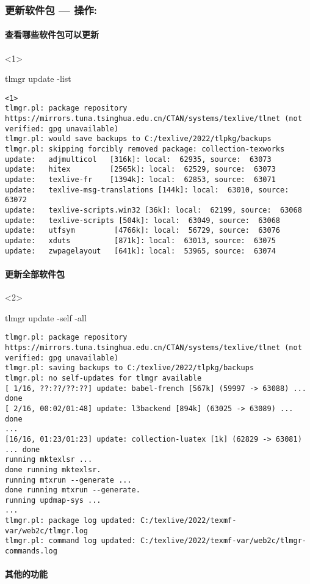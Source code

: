 \begin{frame}[fragile,t]
  \frametitle{更新软件包 --- 操作: }
  \framesubtitle<1>{查看哪些软件包可以更新}
  \begin{onlyenv}<1>
\begin{cmdcode}
tlmgr update -list
\end{cmdcode}
\begin{lstlisting}[basicstyle=\tiny\ttfamily,frame=single]<1>
tlmgr.pl: package repository https://mirrors.tuna.tsinghua.edu.cn/CTAN/systems/texlive/tlnet (not verified: gpg unavailable)
tlmgr.pl: would save backups to C:/texlive/2022/tlpkg/backups
tlmgr.pl: skipping forcibly removed package: collection-texworks
update:   adjmulticol   [316k]: local:  62935, source:  63073
update:   hitex         [2565k]: local:  62529, source:  63073
update:   texlive-fr    [1394k]: local:  62853, source:  63071
update:   texlive-msg-translations [144k]: local:  63010, source:  63072
update:   texlive-scripts.win32 [36k]: local:  62199, source:  63068
update:   texlive-scripts [504k]: local:  63049, source:  63068
update:   utfsym         [4766k]: local:  56729, source:  63076
update:   xduts          [871k]: local:  63013, source:  63075
update:   zwpagelayout   [641k]: local:  53965, source:  63074  
\end{lstlisting}
  \end{onlyenv}
  \framesubtitle<2>{更新全部软件包}
  \begin{onlyenv}<2>
\begin{cmdcode}
tlmgr update -self -all
\end{cmdcode}
\begin{lstlisting}[basicstyle=\tiny\ttfamily,frame=single]
tlmgr.pl: package repository https://mirrors.tuna.tsinghua.edu.cn/CTAN/systems/texlive/tlnet (not verified: gpg unavailable)
tlmgr.pl: saving backups to C:/texlive/2022/tlpkg/backups
tlmgr.pl: no self-updates for tlmgr available
[ 1/16, ??:??/??:??] update: babel-french [567k] (59997 -> 63088) ... done
[ 2/16, 00:02/01:48] update: l3backend [894k] (63025 -> 63089) ... done
...
[16/16, 01:23/01:23] update: collection-luatex [1k] (62829 -> 63081) ... done
running mktexlsr ...
done running mktexlsr.
running mtxrun --generate ...
done running mtxrun --generate.
running updmap-sys ...
...
tlmgr.pl: package log updated: C:/texlive/2022/texmf-var/web2c/tlmgr.log
tlmgr.pl: command log updated: C:/texlive/2022/texmf-var/web2c/tlmgr-commands.log
\end{lstlisting}
  \end{onlyenv}
  \framesubtitle<3>{其他的功能}

\end{frame}
